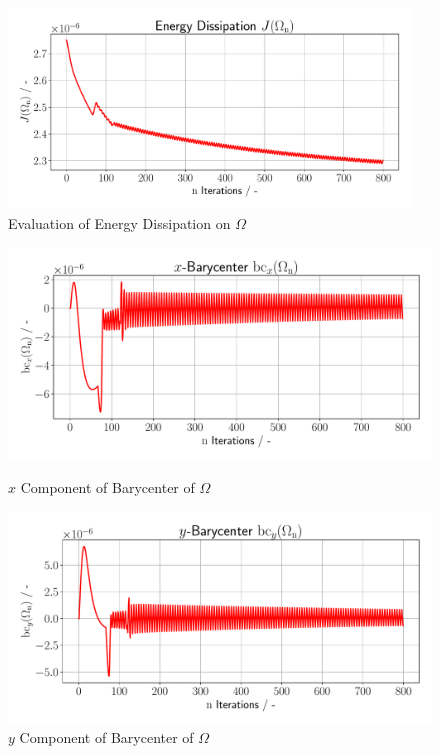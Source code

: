 \begin{figure}
    \begin{center}
        \includegraphics[width=0.95\textwidth]{figures/energy_diss_plot.pdf}
        \caption{Evaluation of Energy Dissipation on $\Omega$}
        \label{plot_ref_energy_diss}
    \end{center}
\end{figure}

\begin{figure}
    \begin{minipage}{.5\textwidth}
        \centering
        \includegraphics[width=1\textwidth]{figures/bc_x__plot.pdf}
        \caption{$x$ Component of Barycenter of $\Omega$}
        \label{plot_ref_bc_x}
    \end{minipage}
    \begin{minipage}{.5\textwidth}
        \centering
        \includegraphics[width=1\textwidth]{figures/bc_y_plot.pdf}
        \caption{$y$ Component of Barycenter of $\Omega$}
        \label{plot_ref_bc_y}
    \end{minipage}
    \end{figure}


